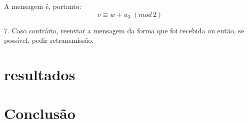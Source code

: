 \documentclass[%
aip,
jmp,%
amsmath,amssymb,
reprint,%
]{revtex4-1}
\begin{document}
	A mensagem é, portanto:
	\begin{equation}
	v \equiv w+u_3\; (mod\, 2)
	\end{equation}
	
	7. Caso contrário, reenviar a mensagem da forma que foi recebida ou então, se possível, pedir retransmissão.
	
	\section{resultados\label{sec:resultados}}
	
	
	
	
	\section{Conclus\~ao}
	
	
	
	
	
\flushleft
\flushleft

\pagebreak
\newpage
\newpage

\cleardoublepage
{}
{}


\end{document}
